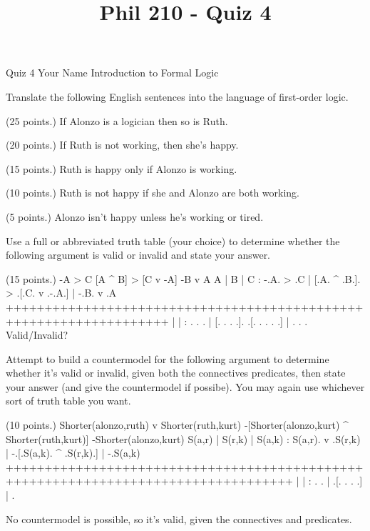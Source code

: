 
\title{Phil 210 - Quiz 4}

\heading
Quiz 4
Your Name
Introduction to Formal Logic
\endheading

Translate the following English sentences into the language of first-order logic.

\problems
{} (25 points.)
If Alonzo is a logician then so is Ruth.
        \answer
        $ $
        \endanswer

 (20 points.)
If Ruth is not working, then she's happy.
        \answer
        $ $
        \endanswer

 (15 points.)
Ruth is happy only if Alonzo is working.
        \answer
        $ $
        \endanswer

 (10 points.)
Ruth is not happy if she and Alonzo are both working.
        \answer
        $ $
        \endanswer

 (5 points.)
Alonzo isn't happy unless he's working or tired.
        \answer
        $ $
        \endanswer

\endproblems

Use a full or abbreviated truth table (your choice) to determine whether the following argument is valid or invalid and state your answer.

\problems
{} (15 points.)
\argument
 -A > C
 [A ^ B] > [C v -A]
\argumentline
 -B v A
\endargument
        \answer
        \truthtable
         A | B | C : -.A. > .C | [.A. ^ .B.]. > .[.C. v .-.A.] | -.B. v .A
        +++++++++++++++++++++++++++++++++++++++++++++++++++++++++++++++++++
           |   |   :  . .   .  | [. .   . .].   .[. .   . . .] |  . .   .
        \endtruthtable
        Valid/Invalid?
        \endanswer

\endproblems

Attempt to build a countermodel for the following argument to determine whether it's valid or invalid, given both the connectives predicates, then state your answer (and give the countermodel if possibe). You may again use whichever sort of truth table you want.

\problems
{} (10 points.)
\argument
 Shorter(alonzo,ruth) v Shorter(ruth,kurt)
 -[Shorter(alonzo,kurt) ^ Shorter(ruth,kurt)]
\argumentline
 -Shorter(alonzo,kurt)
\endargument
        \answer
        \truthtable
         S(a,r) | S(r,k) | S(a,k) : S(a,r). v .S(r,k) | -.[.S(a,k). ^ .S(r,k).] | -.S(a,k)
        +++++++++++++++++++++++++++++++++++++++++++++++++++++++++++++++++++++++++++++++++++
                |        |        :       .   .       |  .[.      .   .      .] |  .
        \endtruthtable

        \heightmodel
         
        \endheightmodel
        \OR
        No countermodel is possible, so it's valid, given the connectives and predicates.
        \endanswer

\endproblems
\bye
